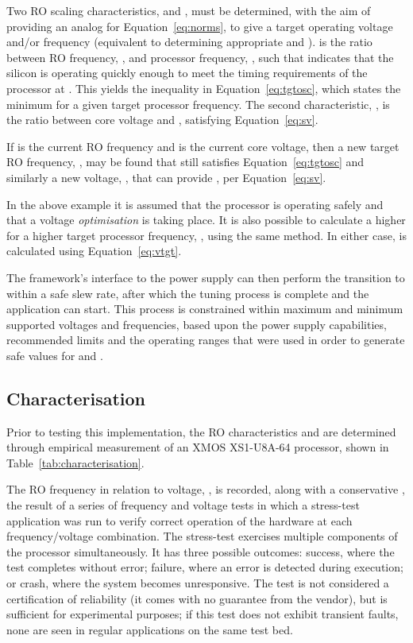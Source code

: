 \documentclass[a4paper,twocolumn,DIV=16]{scrartcl}
\begin{document}
Two RO scaling characteristics,  and , must be determined, with the
aim of providing an analog for Equation~\ref{eq:norms}, to give a target
operating voltage and/or frequency (equivalent to determining appropriate
 and ).  is the ratio between RO frequency,
, and processor frequency, , such that  indicates that the
silicon is operating quickly enough to meet the timing requirements of the
processor at . This yields the inequality in Equation~\ref{eq:tgtosc},
which states the minimum  for a given target processor frequency. The
second characteristic, , is the ratio between core voltage and ,
satisfying Equation~\ref{eq:sv}.



If  is the current RO frequency and  is the current core voltage, then a
new target RO frequency, , may be found that still satisfies
Equation~\ref{eq:tgtosc} and similarly a new voltage, , that can
provide , per Equation~\ref{eq:sv}.

In the above example it is assumed that the processor is operating safely and
that a voltage \emph{optimisation} is taking place. It is also possible to
calculate a higher  for a higher target processor frequency,
, using the same method. In either case,  is calculated
using Equation~\ref{eq:vtgt}.



The framework's interface to the power supply can then perform the transition to
 within a safe slew rate, after which the tuning process is complete
and the application can start. This process is constrained within maximum and
minimum supported voltages and frequencies, based upon the power supply
capabilities, recommended limits and the operating ranges that were used in
order to generate safe values for  and .

\subsection{Characterisation}
\label{sec:characterisation}

Prior to testing this implementation, the RO characteristics  and  are
determined through empirical measurement of an XMOS XS1-U8A-64 processor, shown
in Table~\ref{tab:characterisation}.

The RO frequency in relation to voltage, , is recorded, along with a
conservative , the result of a series of frequency and voltage tests in
which a stress-test application was run to verify correct operation of the
hardware at each frequency/voltage combination. The stress-test exercises
multiple components of the processor simultaneously. It has three possible
outcomes: success, where the test completes without error; failure, where an
error is detected during execution; or crash, where the system becomes
unresponsive. The test is not considered a certification of reliability (it
comes with no guarantee from the vendor), but is sufficient for experimental
purposes; if this test does not exhibit transient faults, none are seen in
regular applications on the same test bed.
\end{document}
